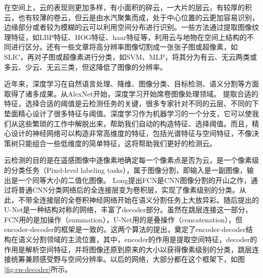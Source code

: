 \documentclass[UTF8]{ctexart}
\begin{document}
在空间上，云的表现则更加多样，有小面积的碎云，一大片的层云，有较厚的积云，也有较薄的卷云，但云是由水汽聚集而成，处于中心位置的云更加容易识别，边缘部分或者较为模糊的云可以利用空间分布进行识别。一些方法通过提取图像纹理特征，如LBP特征、HOG特征、haar特征等，利用云与地物在空间上结构的不同进行区分。还有一些文章将高分辨率图像切割成一张张子图或超像素，如SLIC\cite{achanta2012slic}，再对子图或超像素进行分类，如SVM\cite{lee2004cloud}、MLP\cite{tian1999study}，将其分为有云、无云两类或多云、少云、无云三类，但这降低了图像的分辨率。


近年来，深度学习在自然语言处理、降维、图像分类、目标检测、语义分割等方面取得了诸多成果。从AlexNet开始，深度学习开始席卷图像处理领域。
提取合适的特征，选择合适的阈值是云检测任务的关键，很多专家针对不同的云层、不同的下垫面精心设计了很多特征与阈值。深度学习作为机器学习的一个分支，它可以使我们从这些繁琐的工作中解脱出来，帮助我们自动的构造特征、选择阈值。而且，精心设计的神经网络可以构造非常高维度的特征，包括光谱特征与空间特征，不像决策树只能组合一些低维度的简单特征，这将帮助我们更好的检测云。

云检测的目的是在遥感图像中逐像素地确定每一个像素点是否为云，是一个像素级的分类任务（Pixel-level labeling tasks），属于图像分割，即输入是一副图像，输出是一个同等大小的二值化图像。
Long提出FCN\cite{FCN}是CNN图像分割的开山之作，通过将普通CNN分类网络后的全连接层变为卷积层，实现了像素级别的分类。从此，不带全连接层的全卷积神经网络开始在语义分割任务上大放异彩。随后提出的U-Net\cite{ronneberger2015unet}是一种结构对称的网络，丰富了decoder部分。虽然在跳层连接这一部分，FCN用的是加操作（summation），U-Net用的是叠操作（concatenation），但encoder-decoder的框架是一致的。这两个算法的提出，奠定了encoder-decoder结构在语义分割领域的主流位置，其中，encoder的作用是提取空间特征，decoder的作用是解析空间特征，并将图像还原到原来的大小以获得像素级别的分类，跳层连接统筹兼顾感受野与空间分辨率。以后的网络，大部分都在这个框架下，如图\ref{fig:en-decoder}所示。
\end{document}
